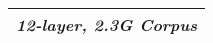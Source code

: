 \begin{table*}[t]
\begin{adjustbox}{width=\linewidth,center}
{\begin{tabular}{ lccccccccccc }
    \hline 
    \multicolumn{12}{c}{\textit{12-layer, 2.3G Corpus}} \\
    \hline 


\end{tabular}}
\end{adjustbox}
\end{table*}
